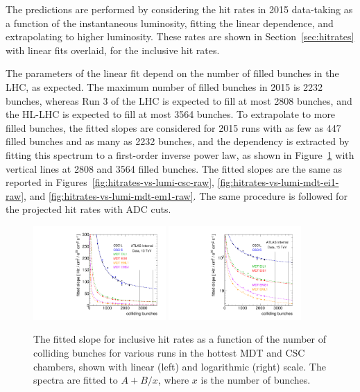 The predictions are performed by considering the hit rates in 2015 data-taking as a function of the instantaneous luminosity, fitting the linear dependence, and extrapolating to higher luminosity. These rates are shown in Section~\ref{sec:hitrates} with linear fits overlaid, for the inclusive hit rates.

The parameters of the linear fit depend on the number of filled bunches in the LHC, as expected. The maximum number of filled bunches in 2015 is 2232 bunches, whereas Run 3 of the LHC is expected to fill at most 2808 bunches, and the HL-LHC is expected to fill at most 3564 bunches. To extrapolate to more filled bunches, the fitted slopes are considered for 2015 runs with as few as 447 filled bunches and as many as 2232 bunches, and the dependency is extracted by fitting this spectrum to a first-order inverse power law, as shown in Figure~\ref{fig:extrapolations-slope-vs-bunches-raw} with vertical lines at 2808 and 3564 filled bunches. The fitted slopes are the same as reported in Figures~\ref{fig:hitrates-vs-lumi-csc-raw}, \ref{fig:hitrates-vs-lumi-mdt-ei1-raw}, and \ref{fig:hitrates-vs-lumi-mdt-em1-raw}. The same procedure is followed for the projected hit rates with ADC cuts.

\begin{figure}
  \begin{center}
    \includegraphics[width=0.45\textwidth]{./figures/slope_vs_bunches_raw_lin.pdf}
    \includegraphics[width=0.45\textwidth]{./figures/slope_vs_bunches_raw_log.pdf}
    \caption{The fitted slope for inclusive hit rates as a function of the number of colliding bunches for various runs in the hottest MDT and CSC chambers, shown with linear (left) and logarithmic (right) scale. The spectra are fitted to $A + B/x$, where $x$ is the number of bunches.}
    \label{fig:extrapolations-slope-vs-bunches-raw}
  \end{center}
\end{figure}

